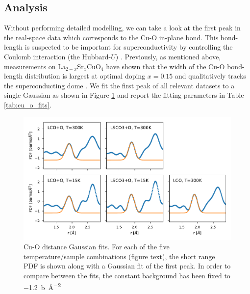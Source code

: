 \subsection{Analysis}
Without performing detailed modelling, we can take a look at the first peak in the real-space data which corresponds to the Cu-O in-plane bond. This bond-length is suspected to be important for superconductivity by controlling the Coulomb interaction (the Hubbard-$U$) \cite{Ivashko2019}. Previously, as mentioned above, measurements on La$_{2-x}$Sr$_x$CuO$_{4}$ have shown that the width of the Cu-O bond-length distribution is largest at optimal doping $x=0.15$ and qualitatively tracks the superconducting dome \cite{Bozin2000}. We fit the first peak of all relevant datasets to a single Gaussian as shown in Figure \ref{fig:cu_o_fits} and report the fitting parameters in Table \ref{tab:cu_o_fits}.

\begin{figure}
    \centering
    \includegraphics[width=\textwidth]{fig/pdf/cu_o_fits.pdf}
    \caption{Cu-O distance Gaussian fits. For each of the five temperature/sample combinations (figure text), the short range PDF is shown along with a Gaussian fit of the first peak. In order to compare between the fits, the constant background has been fixed to \SI{-1.2}{\barn\per\angstrom\squared}}
    \label{fig:cu_o_fits}
\end{figure}

